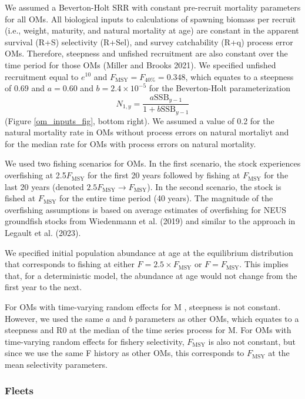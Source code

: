 \documentclass[
  12pt,
]{article}
\newcommand{\Fmsy}{\ensuremath{F_{\text{MSY}}}\xspace}
\begin{document}
We assumed a Beverton-Holt SRR with constant pre-recruit mortality
parameters for all OMs. All biological inputs to calculations of
spawning biomass per recruit (i.e., weight, maturity, and natural
mortality at age) are constant in the apparent survival (R+S)
selectivity (R+Sel), and survey catchability (R+q) process error OMs.
Therefore, steepness and unfished recruitment are also constant over the
time period for those OMs (Miller and Brooks 2021). We specified
unfished recruitment equal to \(e^{10}\) and
\(\Fmsy = F_{40\%} = 0.348\), which equates to a steepness of 0.69 and
\(a=0.60\) and \(b = 2.4 \times 10^{-5}\) for the Beverton-Holt
parameterization \[
N_{1,y} = \frac{a \text{SSB}_{y-1}}{1 + b \text{SSB}_{y-1}} 
\] (Figure \ref{om_inputs_fig}, bottom right). We assumed a value of 0.2
for the natural mortality rate in OMs without process errors on natural
mortaliyt and for the median rate for OMs with process errors on natural
mortality.

We used two fishing scenarios for OMs. In the first scenario, the stock
experiences overfishing at 2.5\Fmsy for the first 20 years followed by
fishing at \Fmsy for the last 20 years (denoted
\(2.5\Fmsy \rightarrow \Fmsy\)). In the second scenario, the stock is
fished at \Fmsy for the entire time period (40 years). The magnitude of
the overfishing assumptions is based on average estimates of overfishing
for NEUS groundfish stocks from Wiedenmann et al. (2019) and similar to
the approach in Legault et al. (2023).

We specified initial population abundance at age at the equilibrium
distribution that corresponds to fishing at either
\(F = 2.5\times \Fmsy\) or \(F = \Fmsy\). This implies that, for a
deterministic model, the abundance at age would not change from the
first year to the next.

For OMs with time-varying random effects for M , steepness is not
constant. However, we used the same \(a\) and \(b\) parameters as other
OMs, which equates to a steepness and R0 at the median of the time
series process for M. For OMs with time-varying random effects for
fishery selectivity, \Fmsy is also not constant, but since we use the
same F history as other OMs, this corresponds to \Fmsy at the mean
selectivity parameters.

\subsubsection*{Fleets}\label{fleets}
\end{document}
